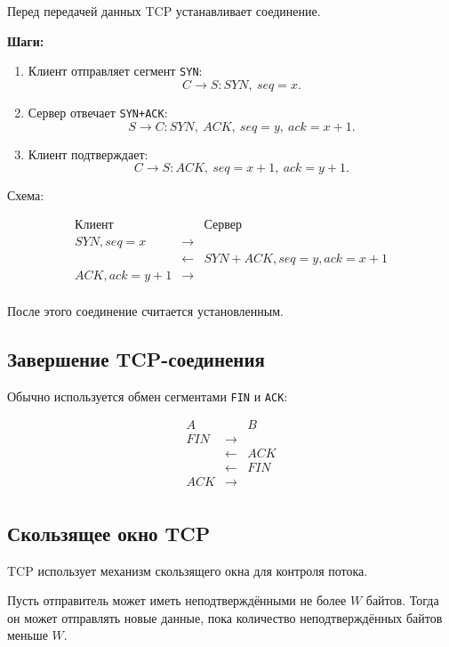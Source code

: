 \documentclass[12pt,a4paper]{article}
\begin{document}
Перед передачей данных TCP устанавливает соединение.

\textbf{Шаги:}

\begin{enumerate}
    \item Клиент отправляет сегмент \texttt{SYN}:
\[
C \rightarrow S: SYN,\ seq=x.
\]
    \item Сервер отвечает \texttt{SYN+ACK}:
\[
S \rightarrow C: SYN,\ ACK,\ seq=y,\ ack=x+1.
\]
    \item Клиент подтверждает:
\[
C \rightarrow S: ACK,\ seq=x+1,\ ack=y+1.
\]
\end{enumerate}

Схема:

\[
\begin{array}{ccc}
\text{Клиент} & & \text{Сервер} \\
SYN, seq=x & \longrightarrow & \\
& \longleftarrow & SYN+ACK, seq=y, ack=x+1 \\
ACK, ack=y+1 & \longrightarrow & \\
\end{array}
\]

После этого соединение считается установленным.

\subsection{Завершение TCP-соединения}

Обычно используется обмен сегментами \texttt{FIN} и \texttt{ACK}:

\[
\begin{array}{ccc}
A & & B \\
FIN & \longrightarrow & \\
& \longleftarrow & ACK \\
& \longleftarrow & FIN \\
ACK & \longrightarrow & \\
\end{array}
\]

\subsection{Скользящее окно TCP}

TCP использует механизм скользящего окна для контроля потока.

Пусть отправитель может иметь неподтверждёнными не более $W$ байтов. Тогда он может отправлять новые данные, пока количество неподтверждённых байтов меньше $W$.
\end{document}
